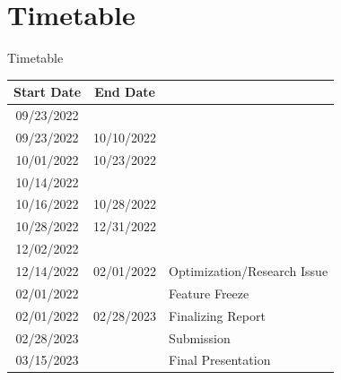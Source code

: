 \documentclass[usenames,dvipsnames,aspectratio=169]{beamer}
\begin{document}
\section{Timetable}
\begin{frame}{Timetable}
\begin{center}
	\begin{small}
	\begin{tabular}{ | c | c | l| }
		\hline
		Start Date & End Date &  \\ 
		\hline\hline
		09/23/2022 & 					& \color{gray}{Project Start}\\
		09/23/2022 & 10/10/2022 	& \color{gray}{Initial Literature Study}\\
		10/01/2022 & 10/23/2022 	& \color{gray}{Initial Data Search}\\
		\hline
		10/14/2022 & 					& \color{gray}{Kick-Off Presentation}\\
		\hline

		10/16/2022 & 10/28/2022 	& \color{gray}{Data Conversion/Costs/test execution}\\
		10/28/2022 & 12/31/2022 	& \color{red}{provide WPS/implement LCP}\\
		\hline
		12/02/2022 & 					& \color{gray}{Midterm  Presentation}\\
		\hline
		12/14/2022 & 02/01/2022 	& Optimization/Research Issue\\
		02/01/2022 & 					& Feature Freeze \\ 
		02/01/2022 & 02/28/2023 	& Finalizing Report\\ 
		\hline
		02/28/2023 & 					& Submission  \\
		03/15/2023 & 					& Final Presentation  \\
		\hline   
	\end{tabular}
	\end{small}
\end{center}
\end{frame}
\end{document}
